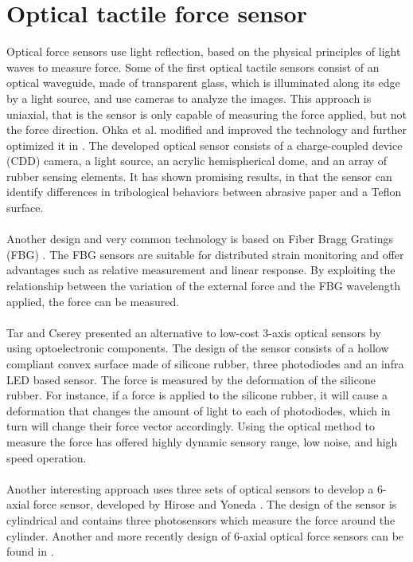 \documentclass[USenglish]{ifimaster}  %
\begin{document}
\section{Optical tactile force sensor}
Optical force sensors use light reflection, based on the physical principles of light waves to measure force. Some of the first optical tactile sensors \cite{220165,Nicholls1990} consist of an optical waveguide, made of transparent glass, which is illuminated along its edge by a light source, and use cameras to analyze the images. This approach is uniaxial, that is the sensor is only capable of measuring the force applied, but not the force direction. Ohka et al. \cite{525384} modified and improved the technology and further optimized it in \cite{572232,ohka_mitsuya_matsunaga_takeuchi_2004,1545264}. The developed optical sensor consists of a charge-coupled device (CDD) camera, a light source, an acrylic hemispherical dome, and an array of rubber sensing elements. It has shown promising results, in that the sensor can identify differences in tribological behaviors between abrasive paper and a Teflon surface. 
\\
\\
Another design and very common technology is based on Fiber Bragg Gratings (FBG) \cite{Heo2006312}. The FBG sensors are suitable for distributed strain monitoring and offer advantages such as relative measurement and linear response. By exploiting the relationship between the variation of the external force and the FBG wavelength applied, the force can be measured.
\\
\\ 
Tar and Cserey \cite{6027100} presented an alternative to low-cost 3-axis optical sensors by using optoelectronic components. The design of the sensor consists of a hollow compliant convex surface made of silicone rubber, three photodiodes and an infra LED based sensor. The force is measured by the deformation of the silicone rubber. For instance, if a force is applied to the silicone rubber, it will cause a deformation that changes the amount of light to each of photodiodes, which in turn will change their force vector accordingly. Using the optical method to measure the force has offered highly dynamic sensory range, low noise, and high speed operation.
\\
\\
Another interesting approach uses three sets of optical sensors to develop a 6-axial force sensor, developed by Hirose and Yoneda \cite{125944}. The design of the sensor is cylindrical and contains three photosensors which measure the force around the cylinder. Another and more recently design of 6-axial optical force sensors can be found in \cite{6907805,6290303}.
\end{document}
